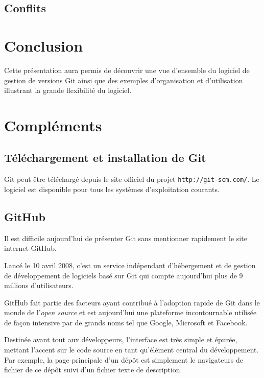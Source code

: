 \documentclass[11pt,a4paper]{article}
\begin{document}
\subsection{Conflits}

\section{Conclusion}

Cette présentation aura permis de découvrir une vue d'ensemble du logiciel de gestion de versions Git ainsi que des exemples d'organisation et d'utilisation illustrant la grande flexibilité du logiciel.

\pagebreak
{}
\section{Compléments}

\subsection{Téléchargement et installation de Git}

Git peut être téléchargé depuis le site officiel du projet {\tt http://git-scm.com/}.
Le logiciel est disponible pour tous les systèmes d'exploitation courants.

\subsection{GitHub}

Il est difficile aujourd'hui de présenter Git sans mentionner rapidement le site internet GitHub.

Lancé le 10 avril 2008, c'est un service indépendant d'hébergement et de gestion de développement de logiciels basé sur Git qui compte aujourd'hui plus de 9 millions d'utilisateurs.

GitHub fait partie des facteurs ayant contribué à l'adoption rapide de Git dans le monde de l'\textit{open source} et est aujourd'hui une plateforme incontournable utilisée de façon intensive par de grands noms tel que Google, Microsoft et Facebook. 

Destinée avant tout aux développeurs, l'interface est très simple et épurée, mettant l'accent sur le code source en tant qu'élément central du développement. Par exemple, la page principale d'un dépôt est simplement le navigateurs de fichier de ce dépôt suivi d'un fichier texte de description.
\end{document}
